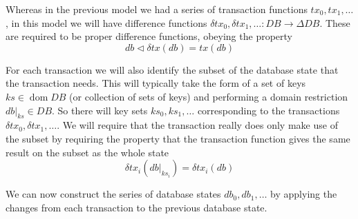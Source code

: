 \documentclass[11pt,a4paper]{article}
\DeclareMathOperator{\dom}{dom}
\newcommand\restrict[2]{\left.#1\right|_{#2}}
\begin{document}
Whereas in the previous model we had a series of transaction functions
$\mathit{tx}_0, \mathit{tx}_1, \ldots$, in this model we will have difference
functions
$\delta\mathit{tx}_0, \delta\mathit{tx}_1, \ldots : \mathit{DB} \to \Delta\mathit{DB}$. These are required to be proper difference functions, obeying the property
\begin{equation}
\label{eq:diff-fun}
db \triangleleft \delta\mathit{tx}(\mathit{db}) = \mathit{tx}(\mathit{db})
\end{equation}

For each transaction we will also identify the subset of the database state that
the transaction needs. This will typically take the form of a set of keys
$\mathit{ks} \in \dom{\mathit{DB}}$ (or collection of sets of keys) and
performing a domain restriction $\restrict{\mathit{db}}{\mathit{ks}} \in \mathit{DB}$.
So there will key sets $\mathit{ks}_0, \mathit{ks}_1, \ldots$ corresponding to
the transactions $\delta\mathit{tx}_0, \delta\mathit{tx}_1, \ldots$.
We will require that the transaction really does only make use of the subset
by requiring the property that the transaction function gives the same result
on the subset as the whole state
\begin{equation}
\label{eq:restrict}
  \delta\mathit{tx}_i(\restrict{\mathit{db}}{\mathit{ks}_i}) = \delta\mathit{tx}_i(\mathit{db})
\end{equation}

We can now construct the series of database states
$\mathit{db}_0, \mathit{db}_1, \ldots$
by applying the changes from each transaction to the previous database state.
\end{document}
